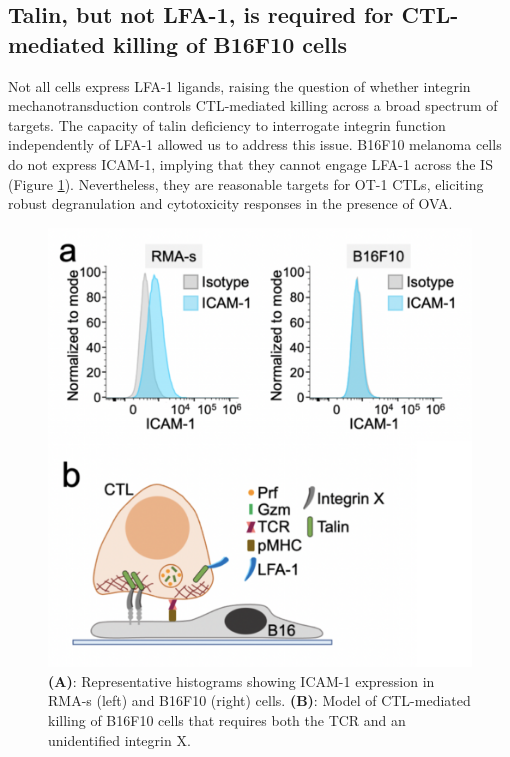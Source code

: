 \subsection{Talin, but not LFA-1, is required for CTL-mediated killing of B16F10 cells}
Not all cells express LFA-1 ligands, raising the question of whether integrin mechanotransduction controls CTL-mediated killing across a broad spectrum of targets. The capacity of talin deficiency to interrogate integrin function independently of LFA-1 allowed us to address this issue. B16F10 melanoma cells do not express ICAM-1, implying that they cannot engage LFA-1 across the IS (Figure \ref{fig:fig5model}). Nevertheless, they are reasonable targets for OT-1 CTLs, eliciting robust degranulation and cytotoxicity responses in the presence of OVA. 

\begin{figure}[htbp]
	\centering
	\includegraphics[width=1.0\columnwidth]{../figures/chapter3/fig5model.png}
	\caption{B16F10 cells do not express ICAM-1.}
	\caption*{\textbf{(A)}: Representative histograms showing ICAM-1 expression in RMA-s (left) and B16F10 (right) cells. \textbf{(B)}: Model of CTL-mediated killing of B16F10 cells that requires both the TCR and an unidentified integrin X.}
	\label{fig:fig5model}
\end{figure} 


